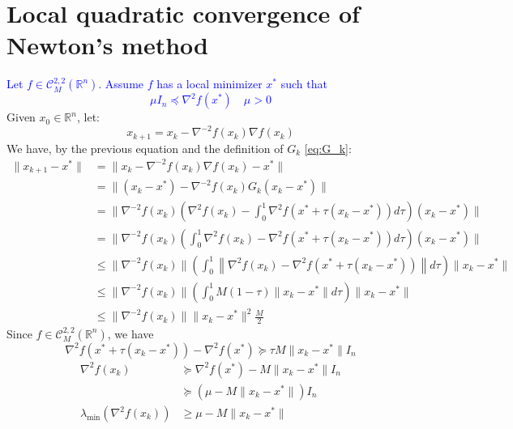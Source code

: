 \documentclass[12pt, openany]{report}
\newcommand{\R}{\mathbb{R}}
\newcommand{\C}{\mathcal{C}}
\theoremstyle{definition}
\begin{document}
\section{Local quadratic convergence of Newton's method}
\textcolor{blue}{Let $f \in \C_M^{2,2}(\R^n)$. Assume $f$ has a local minimizer $x^*$ such that
\begin{equation}\label{eq:hessian_bound2}
	\mu I_n \preceq \nabla^2 f(x^*) \quad \mu > 0
\end{equation}}
Given $x_0 \in \R^n$, let:
\begin{equation}\label{eq:newton}
	x_{k+1} = x_k - \nabla^{-2} f(x_k) \nabla f(x_k)
\end{equation}
We have, by the previous equation and the definition of $G_k$ \eqref{eq:G_k}:
\begin{equation}\label{eq:bound_x_k+1}
	\begin{aligned}
		\|x_{k+1}-x^*\| &= \|x_k - \nabla^{-2} f(x_k) \nabla f(x_k) - x^*\|\\
		&= \|(x_k-x^*)-\nabla^{-2} f(x_k)G_k(x_k-x^*)\|\\
		&= \|\nabla^{-2} f(x_k) \left(\nabla^2f(x_k)-\int_{0}^{1}\nabla^2f(x^*+\tau(x_k-x^*))d\tau\right)(x_k-x^*)\|\\
		&= \|\nabla^{-2} f(x_k) \left( \int_{0}^{1} \nabla^2f(x_k)-\nabla^2f(x^*+\tau(x_k-x^*))d\tau\right)(x_k-x^*)\|\\
		&\leq \|\nabla^{-2} f(x_k)\| \left( \int_{0}^{1} \left\|\nabla^2f(x_k)-\nabla^2f(x^*+\tau(x_k-x^*))\right\|d\tau\right)\|x_k-x^*\|\\
		&\leq \|\nabla^{-2} f(x_k)\| \left( \int_{0}^{1} M(1-\tau) \|x_k-x^*\|d\tau\right)\|x_k-x^*\|\\
		&\leq \|\nabla^{-2} f(x_k)\|\|x_k-x^*\|^2\frac{M}{2}
	\end{aligned}
\end{equation}
Since $f\in \C^{2,2}_M(\R^n)$, we have
\begin{equation}
	\nabla^2 f(x^*+\tau(x_k-x^*)) - \nabla^2 f(x^*) \succeq \tau M \|x_k-x^*\|I_n
\end{equation}
\begin{equation}
	\begin{aligned}
		\nabla^2 f(x_k) &\succeq \nabla^2 f(x^*) - M \|x_k-x^*\|I_n\\
		&\succeq (\mu - M \|x_k-x^*\|)I_n\\
		\lambda_{\min}(\nabla^2 f(x_k)) &\geq \mu - M \|x_k-x^*\|
	\end{aligned}
\end{equation}
\end{document}
